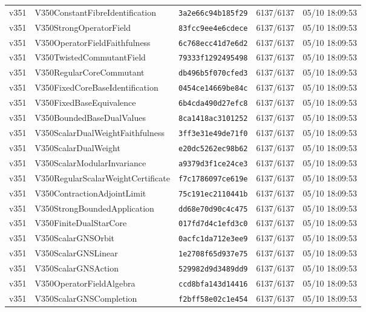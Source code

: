 \documentclass[11pt]{article}
\theoremstyle{definition}\newtheorem{deriv}{Derivation}
\begin{document}
{\begin{longtable}{@{}lllll@{}}
v351 & V350ConstantFibreIdentification & \texttt{3a2e66c94b185f29} & 6137/6137 & 05/10 18:09:53 \\
v351 & V350StrongOperatorField & \texttt{83fcc9ee4e6cdece} & 6137/6137 & 05/10 18:09:53 \\
v351 & V350OperatorFieldFaithfulness & \texttt{6c768ecc41d7e6d2} & 6137/6137 & 05/10 18:09:53 \\
v351 & V350TwistedCommutantField & \texttt{79333f1292495498} & 6137/6137 & 05/10 18:09:53 \\
v351 & V350RegularCoreCommutant & \texttt{db496b5f070cfed3} & 6137/6137 & 05/10 18:09:53 \\
v351 & V350FixedCoreBaseIdentification & \texttt{0454ce14669be84c} & 6137/6137 & 05/10 18:09:53 \\
v351 & V350FixedBaseEquivalence & \texttt{6b4cda490d27efc8} & 6137/6137 & 05/10 18:09:53 \\
v351 & V350BoundedBaseDualValues & \texttt{8ca1418ac3101252} & 6137/6137 & 05/10 18:09:53 \\
v351 & V350ScalarDualWeightFaithfulness & \texttt{3ff3e31e49de71f0} & 6137/6137 & 05/10 18:09:53 \\
v351 & V350ScalarDualWeight & \texttt{e20dc5262ec98b62} & 6137/6137 & 05/10 18:09:53 \\
v351 & V350ScalarModularInvariance & \texttt{a9379d3f1ce24ce3} & 6137/6137 & 05/10 18:09:53 \\
v351 & V350RegularScalarWeightCertificate & \texttt{f7c1786097ce619e} & 6137/6137 & 05/10 18:09:53 \\
v351 & V350ContractionAdjointLimit & \texttt{75c191ec2110441b} & 6137/6137 & 05/10 18:09:53 \\
v351 & V350StrongBoundedApplication & \texttt{dd68e70d90c4c475} & 6137/6137 & 05/10 18:09:53 \\
v351 & V350FiniteDualStarCore & \texttt{017fd7d4c1efd3c0} & 6137/6137 & 05/10 18:09:53 \\
v351 & V350ScalarGNSOrbit & \texttt{0acfc1da712e3ee9} & 6137/6137 & 05/10 18:09:53 \\
v351 & V350ScalarGNSLinear & \texttt{1e2708f65d937e75} & 6137/6137 & 05/10 18:09:53 \\
v351 & V350ScalarGNSAction & \texttt{529982d9d3489dd9} & 6137/6137 & 05/10 18:09:53 \\
v351 & V350OperatorFieldAlgebra & \texttt{ccd8bfa143d14416} & 6137/6137 & 05/10 18:09:53 \\
v351 & V350ScalarGNSCompletion & \texttt{f2bff58e02c1e454} & 6137/6137 & 05/10 18:09:53 \\

\end{longtable}}
\end{document}

